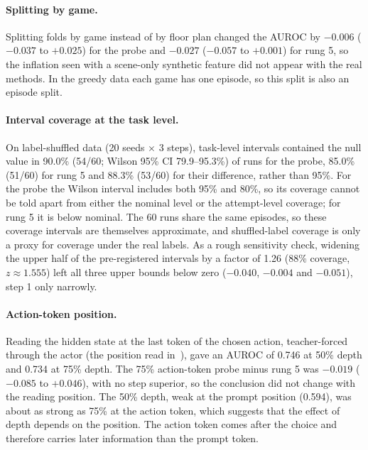 \documentclass[11pt]{article}
\begin{document}
\paragraph{Splitting by game.} Splitting folds by game instead of by floor plan changed the AUROC by $-0.006$ ($-0.037$ to $+0.025$) for the probe and $-0.027$ ($-0.057$ to $+0.001$) for rung 5, so the inflation seen with a scene-only synthetic feature did not appear with the real methods. In the greedy data each game has one episode, so this split is also an episode split.

\paragraph{Interval coverage at the task level.} On label-shuffled data (20 seeds $\times$ 3 steps), task-level intervals contained the null value in 90.0\% (54/60; Wilson 95\% CI 79.9--95.3\%) of runs for the probe, 85.0\% (51/60) for rung 5 and 88.3\% (53/60) for their difference, rather than 95\%. For the probe the Wilson interval includes both 95\% and 80\%, so its coverage cannot be told apart from either the nominal level or the attempt-level coverage; for rung 5 it is below nominal. The 60 runs share the same episodes, so these coverage intervals are themselves approximate, and shuffled-label coverage is only a proxy for coverage under the real labels. As a rough sensitivity check, widening the upper half of the pre-registered intervals by a factor of 1.26 (88\% coverage, $z \approx 1.555$) left all three upper bounds below zero ($-0.040$, $-0.004$ and $-0.051$), step 1 only narrowly.

\paragraph{Action-token position.} Reading the hidden state at the last token of the chosen action, teacher-forced through the actor (the position read in~\cite{ruan2026doomed}), gave an AUROC of 0.746 at 50\% depth and 0.734 at 75\% depth. The 75\% action-token probe minus rung 5 was $-0.019$ ($-0.085$ to $+0.046$), with no step superior, so the conclusion did not change with the reading position. The 50\% depth, weak at the prompt position (0.594), was about as strong as 75\% at the action token, which suggests that the effect of depth depends on the position. The action token comes after the choice and therefore carries later information than the prompt token.
\end{document}
